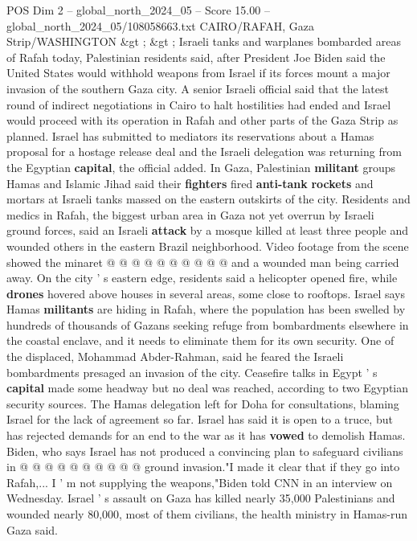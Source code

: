 \begin{textsample}{POS Dim 2 – global\_north\_2024\_05 – Score 15.00 – global\_north\_2024\_05/108058663.txt}  \label{ex:f2_pos_388}
CAIRO/RAFAH, Gaza Strip/WASHINGTON \&gt ; \&gt ; Israeli tanks and warplanes bombarded areas of Rafah today, Palestinian residents said, after President Joe Biden said the United States would withhold weapons from Israel if its forces mount a major invasion of the southern Gaza city.
A senior Israeli official said that the latest round of indirect negotiations in Cairo to halt hostilities had ended and Israel would proceed with its operation in Rafah and other parts of the Gaza Strip as planned.
Israel has submitted to mediators its reservations about a Hamas proposal for a hostage release deal and the Israeli delegation was returning from the Egyptian \textbf{capital}, the official added.
In Gaza, Palestinian \textbf{militant} groups Hamas and Islamic Jihad said their \textbf{fighters} fired \textbf{anti-tank} \textbf{rockets} and mortars at Israeli tanks massed on the eastern outskirts of the city.
Residents and medics in Rafah, the biggest urban area in Gaza not yet overrun by Israeli ground forces, said an Israeli \textbf{attack} by a mosque killed at least three people and wounded others in the eastern Brazil neighborhood.
Video footage from the scene showed the minaret @ @ @ @ @ @ @ @ @ @ and a wounded man being carried away.
On the city ' s eastern edge, residents said a helicopter opened fire, while \textbf{drones} hovered above houses in several areas, some close to rooftops.
Israel says Hamas \textbf{militants} are hiding in Rafah, where the population has been swelled by hundreds of thousands of Gazans seeking refuge from bombardments elsewhere in the coastal enclave, and it needs to eliminate them for its own security.
One of the displaced, Mohammad Abder-Rahman, said he feared the Israeli bombardments presaged an invasion of the city.
Ceasefire talks in Egypt ' s \textbf{capital} made some headway but no deal was reached, according to two Egyptian security sources.
The Hamas delegation left for Doha for consultations, blaming Israel for the lack of agreement so far.
Israel has said it is open to a truce, but has rejected demands for an end to the war as it has \textbf{vowed} to demolish Hamas.
Biden, who says Israel has not produced a convincing plan to safeguard civilians in @ @ @ @ @ @ @ @ @ @ ground invasion."I made it clear that if they go into Rafah,...
I ' m not supplying the weapons,"Biden told CNN in an interview on Wednesday.
Israel ' s assault on Gaza has killed nearly 35,000 Palestinians and wounded nearly 80,000, most of them civilians, the health ministry in Hamas-run Gaza said.

\end{textsample}
